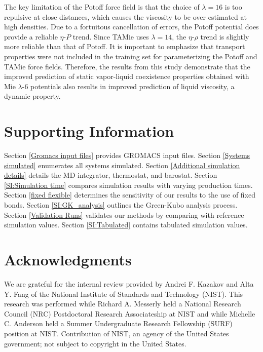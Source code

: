 \documentclass[preprint,review,12pt]{elsarticle}
\begin{document}
	The key limitation of the Potoff force field is that the choice of $\lambda = 16$ is too repulsive at close distances, which causes the viscosity to be over estimated at high densities. Due to a fortuitous cancellation of errors, the Potoff potential does provide a reliable $\eta$-$P$ trend. Since TAMie uses $\lambda =14$, the $\eta$-$\rho$ trend is slightly more reliable than that of Potoff. It is important to emphasize that transport properties were not included in the training set for parameterizing the Potoff and TAMie force fields. Therefore, the results from this study demonstrate that the improved prediction of static vapor-liquid coexistence properties obtained with Mie $\lambda$-6 potentials also results in improved prediction of liquid viscosity, a dynamic property.
	
	
	\section*{Supporting Information}
	
    Section \ref{Gromacs input files} provides GROMACS input files.	Section \ref{Systems simulated} enumerates all systems simulated. Section \ref{Additional simulation details} details the MD integrator, thermostat, and barostat. Section \ref{SI:Simulation time} compares simulation results with varying production times. Section \ref{fixed flexible} determines the sensitivity of our results to the use of fixed bonds. Section \ref{SI:GK_analysis} outlines the Green-Kubo analysis process. Section \ref{Validation Runs} validates our methods by comparing with reference simulation values. Section \ref{SI:Tabulated} contains tabulated simulation values.       
	
	\section*{Acknowledgments}
	
	We are grateful for the internal review provided by Andrei F. Kazakov and Alta Y. Fang of the National Institute of Standards and Technology (NIST). This research was performed while Richard A. Messerly held a National Research Council (NRC) Postdoctoral Research Associateship at NIST and while Michelle C. Anderson held a Summer Undergraduate Research Fellowship (SURF) position at NIST. Contribution of NIST, an agency of the United States government; not subject to copyright in the United States.
	
	
	
		
\end{document}

